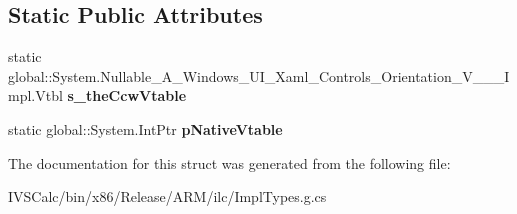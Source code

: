 \subsection*{Static Public Attributes}
\begin{DoxyCompactItemize}
\item 
\mbox{\label{struct_system_1_1_nullable___a___windows___u_i___xaml___controls___orientation___v_______impl_1_1_vtbl_a41d946f52265b05b142b2057934c496f}} 
static global\+::\+System.\+Nullable\+\_\+\+A\+\_\+\+Windows\+\_\+\+U\+I\+\_\+\+Xaml\+\_\+\+Controls\+\_\+\+Orientation\+\_\+\+V\+\_\+\+\_\+\+\_\+\+Impl.\+Vtbl {\bfseries s\+\_\+the\+Ccw\+Vtable}
\item 
\mbox{\label{struct_system_1_1_nullable___a___windows___u_i___xaml___controls___orientation___v_______impl_1_1_vtbl_a23e03ccec919008e924e2af197ab94ef}} 
static global\+::\+System.\+Int\+Ptr {\bfseries p\+Native\+Vtable}
\end{DoxyCompactItemize}


The documentation for this struct was generated from the following file\+:\begin{DoxyCompactItemize}
\item 
I\+V\+S\+Calc/bin/x86/\+Release/\+A\+R\+M/ilc/Impl\+Types.\+g.\+cs\end{DoxyCompactItemize}
